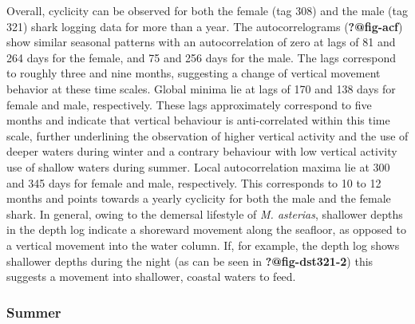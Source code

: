 \documentclass[
  authoryear,
  review,
  3p]{elsarticle}
\begin{document}
Overall, cyclicity can be observed for both the female (tag 308) and the
male (tag 321) shark logging data for more than a year. The
autocorrelograms (\textbf{?@fig-acf}) show similar seasonal patterns
with an autocorrelation of zero at lags of 81 and 264 days for the
female, and 75 and 256 days for the male. The lags correspond to roughly
three and nine months, suggesting a change of vertical movement behavior
at these time scales. Global minima lie at lags of 170 and 138 days for
female and male, respectively. These lags approximately correspond to
five months and indicate that vertical behaviour is anti-correlated
within this time scale, further underlining the observation of higher
vertical activity and the use of deeper waters during winter and a
contrary behaviour with low vertical activity use of shallow waters
during summer. Local autocorrelation maxima lie at 300 and 345 days for
female and male, respectively. This corresponds to 10 to 12 months and
points towards a yearly cyclicity for both the male and the female
shark. In general, owing to the demersal lifestyle of \emph{M.
asterias}, shallower depths in the depth log indicate a shoreward
movement along the seafloor, as opposed to a vertical movement into the
water column. If, for example, the depth log shows shallower depths
during the night (as can be seen in \textbf{?@fig-dst321-2}) this
suggests a movement into shallower, coastal waters to feed.

\hypertarget{sec-disc-summer}{%
\subsubsection{Summer}\label{sec-disc-summer}}
\end{document}
